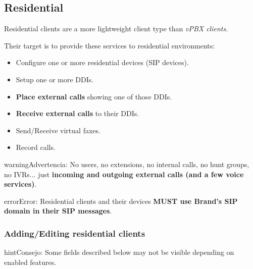 \documentclass[letterpaper,10pt,spanish]{sphinxmanual}
\begin{document}
\subsection{Residential}
\label{administration_portal/brand/clients/residential:residential}\label{administration_portal/brand/clients/residential::doc}
Residential clients are a more lightweight client type than \emph{vPBX clients}.

Their target is to provide these services to residential environments:
\begin{itemize}
\item {} 
Configure one or more residential devices (SIP devices).

\item {} 
Setup one or more DDIs.

\item {} 
\textbf{Place external calls} showing one of those DDIs.

\item {} 
\textbf{Receive external calls} to their DDIs.

\item {} 
Send/Receive virtual faxes.

\item {} 
Record calls.

\end{itemize}

\begin{notice}{warning}{Advertencia:}
No users, no extensions, no internal calls, no hunt groups, no IVRs... just \textbf{incoming and outgoing external
calls (and a few voice services)}.
\end{notice}

\begin{notice}{error}{Error:}
Residential clients and their devices \textbf{MUST use Brand's SIP domain in their SIP messages}.
\end{notice}


\subsubsection{Adding/Editing residential clients}
\label{administration_portal/brand/clients/residential:adding-editing-residential-clients}
\begin{notice}{hint}{Consejo:}
Some fields described below may not be visible depending on enabled features.
\end{notice}
\end{document}
